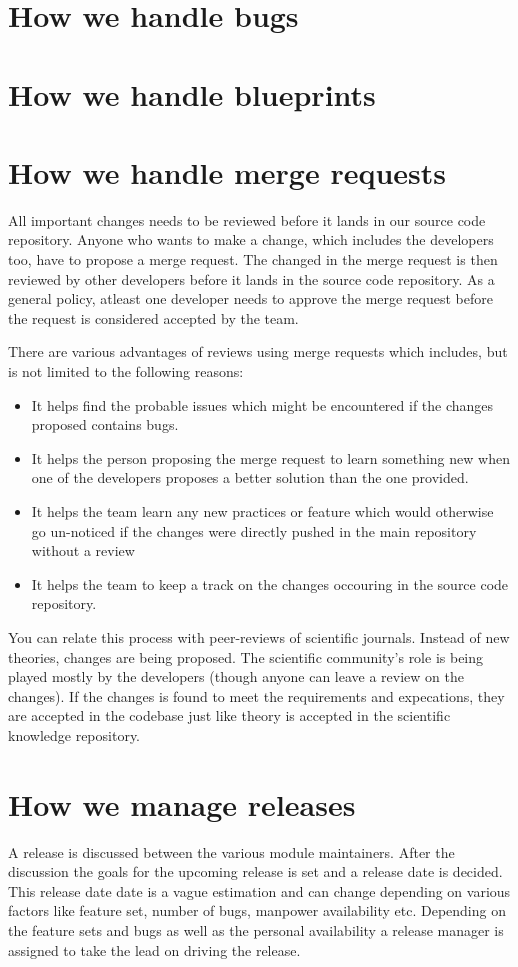 \section{How we handle bugs}
\section{How we handle blueprints}
\section{How we handle merge requests}

All important changes needs to be reviewed before it lands in our source 
code repository. Anyone who wants to make a change, which includes the 
developers too, have to propose a merge request. The changed in the merge 
request is then reviewed by other developers before it lands in the source 
code repository. As a general policy, atleast one developer needs to approve 
the merge request before the request is considered accepted by the team.

There are various advantages of reviews using merge requests which includes, 
but is not limited to the following reasons:

\begin{itemize}
\item It helps find the probable issues which might be encountered if the 
changes proposed contains bugs.
\item It helps the person proposing the merge request to learn something new 
when one of the developers proposes a better solution than the one provided.
\item It helps the team learn any new practices or feature which would 
otherwise go un-noticed if the changes were directly pushed in the main 
repository without a review
\item It helps the team to keep a track on the changes occouring in the source 
code repository.
\end{itemize}

You can relate this process with peer-reviews of scientific journals. Instead of 
new theories, changes are being proposed. The scientific community's role is being 
played mostly by the developers (though anyone can leave a review on the changes). 
If the changes is found to meet the requirements and expecations, they are 
accepted in the codebase just like theory is accepted in the scientific 
knowledge repository.

\section{How we manage releases}
A release is discussed between the various module maintainers. 
After the discussion the goals for the upcoming release is set 
and a release date is decided. This release date date is a vague 
estimation and can change depending on various factors like 
feature set, number of bugs, manpower availability etc. 
Depending on the feature sets and bugs as well as the personal 
availability a release manager is assigned to take the lead 
on driving the release.


